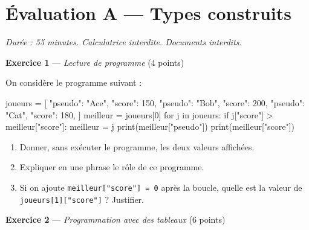 \section*{Évaluation A --- Types construits}
\textit{Durée : 55 minutes. Calculatrice interdite. Documents interdits.}


\bigskip

\textbf{Exercice 1} --- \textit{Lecture de programme} \hfill (4 points)

On considère le programme suivant :
\begin{python}
joueurs = [
    {"pseudo": "Ace", "score": 150},
    {"pseudo": "Bob", "score": 200},
    {"pseudo": "Cat", "score": 180},
]
meilleur = joueurs[0]
for j in joueurs:
    if j["score"] > meilleur["score"]:
        meilleur = j
print(meilleur["pseudo"])
print(meilleur["score"])
\end{python}


\begin{enumerate}
  \item Donner, sans exécuter le programme, les deux valeurs affichées.
  \item Expliquer en une phrase le rôle de ce programme.
  \item Si on ajoute \lstinline{meilleur["score"] = 0} après la boucle,
        quelle est la valeur de \lstinline{joueurs[1]["score"]} ? Justifier.
\end{enumerate}

\bigskip

\textbf{Exercice 2} --- \textit{Programmation avec des tableaux} \hfill (6 points)

